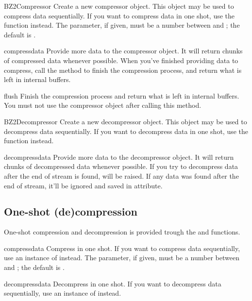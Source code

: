 \begin{classdesc}{BZ2Compressor}{}
Create a new compressor object. This object may be used to compress
data sequentially. If you want to compress data in one shot, use the
 function instead. The  parameter,
if given, must be a number between  and ; the default
is .
\end{classdesc}

\begin{methoddesc}[BZ2Compressor]{compress}{data}
Provide more data to the compressor object. It will return chunks of compressed
data whenever possible. When you've finished providing data to compress, call
the  method to finish the compression process, and return what
is left in internal buffers.
\end{methoddesc}

\begin{methoddesc}[BZ2Compressor]{flush}{}
Finish the compression process and return what is left in internal buffers. You
must not use the compressor object after calling this method.
\end{methoddesc}

\begin{classdesc}{BZ2Decompressor}{}
Create a new decompressor object. This object may be used to decompress
data sequentially. If you want to decompress data in one shot, use the
 function instead.
\end{classdesc}

\begin{methoddesc}[BZ2Decompressor]{decompress}{data}
Provide more data to the decompressor object. It will return chunks of
decompressed data whenever possible. If you try to decompress data after the
end of stream is found,  will be raised. If any data was
found after the end of stream, it'll be ignored and saved in
 attribute.
\end{methoddesc}


\subsection{One-shot (de)compression}

One-shot compression and decompression is provided trough the
 and  functions.

\begin{funcdesc}{compress}{data}
Compress  in one shot. If you want to compress data sequentially,
use an instance of  instead. The 
parameter, if given, must be a number between  and ;
the default is .
\end{funcdesc}

\begin{funcdesc}{decompress}{data}
Decompress  in one shot. If you want to decompress data
sequentially, use an instance of  instead.
\end{funcdesc}
